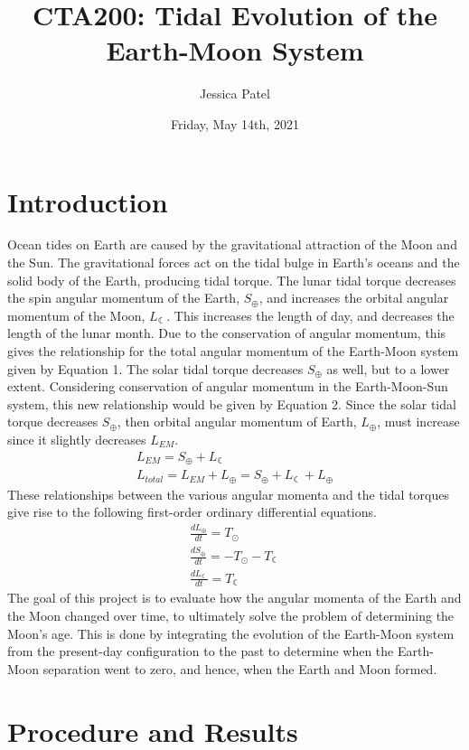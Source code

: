 \documentclass[12pt]{article}
\title{CTA200: Tidal Evolution of the Earth-Moon System}
\author{Jessica Patel}
\date{Friday, May 14th, 2021}
\begin{document}
\maketitle

\section{Introduction}
Ocean tides on Earth are caused by the gravitational attraction of the Moon and the Sun. The gravitational forces act on the tidal bulge in Earth's oceans and the solid body of the Earth, producing tidal torque. The lunar tidal torque decreases the spin angular momentum of the Earth, $S_{\oplus}$, and increases the orbital angular momentum of the Moon, $L_{\leftmoon}$. This increases the length of day, and decreases the length of the lunar month. Due to the conservation of angular momentum, this gives the relationship for the total angular momentum of the Earth-Moon system given by Equation 1. The solar tidal torque decreases $S_{\oplus}$ as well, but to a lower extent. Considering conservation of angular momentum in the Earth-Moon-Sun system, this new relationship would be given by Equation 2. Since the solar tidal torque decreases $S_\oplus$, then orbital angular momentum of Earth, $L_{\oplus}$, must increase since it slightly decreases $L_{EM}$. 
\begin{eqnarray}
L_{EM} = S_{\oplus} + L_{\leftmoon} \\
L_{total} = L_{EM} + L_{\oplus} =  S_{\oplus} + L_{\leftmoon} + L_{\oplus}
\end{eqnarray}
These relationships between the various angular momenta and the tidal torques give rise to the following first-order ordinary differential equations.
\begin{eqnarray}
\frac{dL_{\oplus}}{dt} = T_{\odot} \\
\frac{dS_{\oplus}}{dt} = - T_{\odot} - T_{\leftmoon} \\
\frac{dL_{\leftmoon}}{dt} = T_{\leftmoon}
\end{eqnarray}
The goal of this project is to evaluate how the angular momenta of the Earth and the Moon changed over time, to ultimately solve the problem of determining the Moon's age. This is done by integrating the evolution of the Earth-Moon system from the present-day configuration to the past to determine when the Earth-Moon separation went to zero, and hence, when the Earth and Moon formed. 

\section{Procedure and Results}
\end{document}

